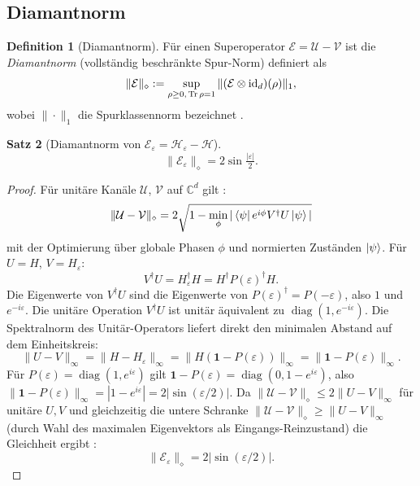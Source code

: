 ﻿\documentclass[11pt,a4paper]{article}
\theoremstyle{definition}
\newtheorem{theorem}{Satz}[section]
\newtheorem{definition}[theorem]{Definition}
\DeclareMathOperator{\diag}{diag}
\newcommand{\eps}{\varepsilon}
\newcommand{\Heps}{H_{\!\varepsilon}}
\newcommand{\C}{\mathbb{C}}
\begin{document}
\subsection{Diamantnorm}
\label{subsec:diamond}

\begin{definition}[Diamantnorm]
  Für einen Superoperator $\mathcal{E} = \mathcal{U} - \mathcal{V}$ ist die
  \emph{Diamantnorm} (vollständig beschränkte Spur-Norm) definiert als
  \begin{equation}
    \|\mathcal{E}\|_\diamond := \sup_{\rho \geq 0,\, \Tr\rho = 1}
    \|(\mathcal{E}\otimes\mathrm{id}_{d})(\rho)\|_1,
    \label{eq:diamond_def}
  \end{equation}
  wobei $\|\cdot\|_1$ die Spurklassennorm bezeichnet \cite{Kitaev2002}.
\end{definition}

\begin{theorem}[Diamantnorm von $\mathcal{E}_\eps = \mathcal{H}_\eps - \mathcal{H}$]
\label{thm:diamond}
  \begin{equation}
    \|\mathcal{E}_\eps\|_\diamond = 2\sin\!\tfrac{|\eps|}{2}.
    \label{eq:diamond_result}
  \end{equation}
\end{theorem}

\begin{proof}
  Für unitäre Kanäle $\mathcal{U}$, $\mathcal{V}$ auf $\C^d$ gilt
  \cite{Watrous2018}:
  \[
    \|\mathcal{U} - \mathcal{V}\|_\diamond = 2\sqrt{1 - \min_\phi |\bra{\psi}e^{i\phi}V^\dagger U\ket{\psi}|}
  \]
  mit der Optimierung über globale Phasen $\phi$ und normierten Zuständen $\ket{\psi}$.
  Für $U=H$, $V=\Heps$:
  \[
    V^\dagger U = \Heps^\dagger H = H^\dagger P(\eps)^\dagger H.
  \]
  Die Eigenwerte von $V^\dagger U$ sind die Eigenwerte von $P(\eps)^\dagger = P(-\eps)$,
  also $1$ und $e^{-i\eps}$.  Die unitäre Operation $V^\dagger U$ ist unitär äquivalent
  zu $\diag(1, e^{-i\eps})$.  Die Spektralnorm des Unitär-Operators liefert direkt
  den minimalen Abstand auf dem Einheitskreis:
  \[
    \|U - V\|_\infty = \|H - \Heps\|_\infty = \|H(\mathbf{1} - P(\eps))\|_\infty
    = \|\mathbf{1} - P(\eps)\|_\infty.
  \]
  Für $P(\eps) = \diag(1, e^{i\eps})$ gilt
  $\mathbf{1} - P(\eps) = \diag(0, 1-e^{i\eps})$, also
  $\|\mathbf{1}-P(\eps)\|_\infty = |1-e^{i\eps}| = 2|\sin(\eps/2)|$.
  Da $\|\mathcal{U}-\mathcal{V}\|_\diamond \leq 2\|U-V\|_\infty$ für unitäre $U,V$
  und gleichzeitig die untere Schranke
  $\|\mathcal{U}-\mathcal{V}\|_\diamond \geq \|U-V\|_\infty$
  (durch Wahl des maximalen Eigenvektors als Eingangs-Reinzustand) die Gleichheit
  ergibt \cite{Kitaev2002,Watrous2018}:
  \[
    \|\mathcal{E}_\eps\|_\diamond = 2|\sin(\eps/2)|.
  \]
\end{proof}
\end{document}
